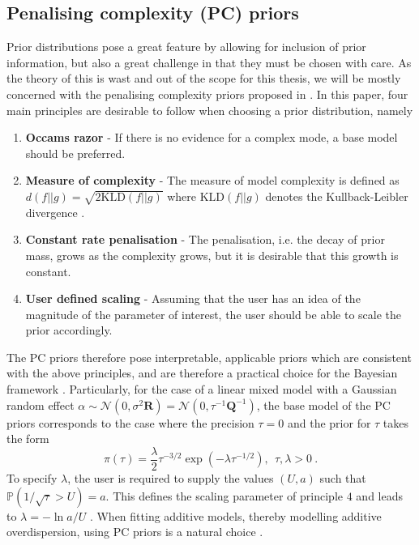 \subsection{Penalising complexity (PC) priors}
\label{seq:PC_prior}
Prior distributions pose a great feature by allowing for inclusion of prior information, but also a great challenge in that they must be chosen with care.
As the theory of this is wast and out of the scope for this thesis, we will be mostly concerned with the penalising complexity priors proposed in \citet{simpson2017penalising}.
In this paper, four main principles are desirable to follow when choosing a prior distribution, namely 
\begin{enumerate}
    \item \textbf{Occams razor} - If there is no evidence for a complex mode, a base model should be preferred. 
    \item \textbf{Measure of complexity} - The measure of model complexity is defined as $d(f \lvert \lvert g) = \sqrt{2 \text{KLD}(f \lvert \lvert g)}$ where $\text{KLD}(f \lvert \lvert g)$ denotes the Kullback-Leibler divergence \citep[for more information]{simpson2017penalising}.
    \item \textbf{Constant rate penalisation} - The penalisation, i.e. the decay of prior mass, grows as the complexity grows, but it is desirable that this growth is constant.
    \item \textbf{User defined scaling} - Assuming that the user has an idea of the magnitude of the parameter of interest, the user should be able to scale the prior accordingly.
\end{enumerate}
The PC priors therefore pose interpretable, applicable priors which are consistent with the above principles, and are therefore a practical choice for the Bayesian framework \citep{simpson2017penalising}. 
Particularly, for the case of a linear mixed model with a Gaussian random effect $\alpha \sim \mathcal{N}(0, \sigma^2 \mathbf{R}) = \mathcal{N}(0, \tau^{-1} \mathbf{Q}^{-1})$, the base model of the PC priors corresponds to the case where the precision $\tau=0$ and the prior for $\tau$ takes the form
\begin{equation}
    \label{eq:PC_prior}
    \pi(\tau) = \frac{\lambda}{2} \tau^{-3/2} \exp\left(-\lambda \tau^{-1/2}\right), \ \   \tau, \lambda>0 \ .
\end{equation}
To specify $\lambda$, the user is required to supply the values $(U, a)$ such that $\mathbb{P}(1/\sqrt{\tau} > U) = a$. 
This defines the scaling parameter of principle $4$ and leads to $\lambda=-\ln{a}/U$ \citep{simpson2017penalising}.
When fitting additive models, thereby modelling additive overdispersion, using PC priors is a natural choice \citep{gomezrubio2020inla}.

